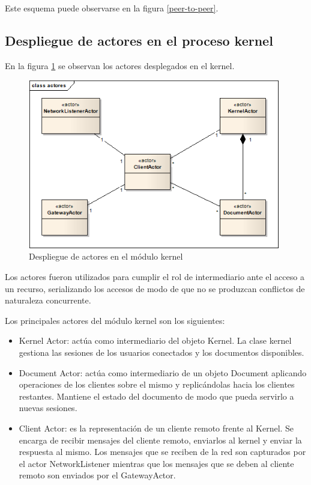 \documentclass[12pt,a4paper]{article}
\begin{document}
Este esquema puede observarse en la figura \ref{peer-to-peer}.

\subsection{Despliegue de actores en el proceso kernel}

En la figura \ref{actores-kernel} se observan los actores desplegados en el kernel.

	\begin{figure}[!ht]
		\begin{center}
			\includegraphics[width=11cm]{actores-kernel.png}
			\caption{\label{actores-kernel} Despliegue de actores en el módulo kernel }
		\end{center}
	\end{figure}

Los actores fueron utilizados para cumplir el rol de intermediario ante el acceso a un recurso, serializando los accesos de
modo de que no se produzcan conflictos de naturaleza concurrente.

Los principales actores del módulo kernel son los siguientes:
\begin{itemize}
	\item Kernel Actor: actúa como intermediario del objeto Kernel. La clase kernel gestiona las sesiones de los usuarios
	conectados y los documentos disponibles.
	\item Document Actor: actúa como intermediario de un objeto Document aplicando operaciones de los clientes sobre el mismo
	y replicándolas hacia los clientes restantes. Mantiene el estado del documento de modo que pueda servirlo a nuevas sesiones.
	\item Client Actor: es la representación de un cliente remoto frente al Kernel. Se encarga de recibir mensajes del
	cliente remoto, enviarlos al kernel y enviar la respuesta al mismo. Los mensajes que se reciben de la red son capturados por
	el actor NetworkListener mientras que los mensajes que se deben al cliente remoto son enviados por el GatewayActor.
\end{itemize}
\end{document}
